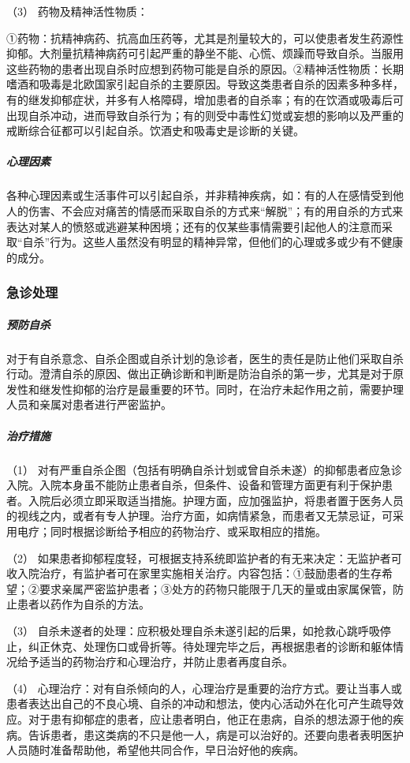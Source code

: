 \hypertarget{text00052.htmlux5cux23CHP1-18-10-2-2-3}{}
（3） 药物及精神活性物质：

①药物：抗精神病药、抗高血压药等，尤其是剂量较大的，可以使患者发生药源性抑郁。大剂量抗精神病药可引起严重的静坐不能、心慌、烦躁而导致自杀。当服用这些药物的患者出现自杀时应想到药物可能是自杀的原因。②精神活性物质：长期嗜酒和吸毒是北欧国家引起自杀的主要原因。导致这类患者自杀的因素多种多样，有的继发抑郁症状，并多有人格障碍，增加患者的自杀率；有的在饮酒或吸毒后可出现自杀冲动，进而导致自杀行为；有的则受中毒性幻觉或妄想的影响以及严重的戒断综合征都可以引起自杀。饮酒史和吸毒史是诊断的关键。

\subparagraph{心理因素}

各种心理因素或生活事件可以引起自杀，并非精神疾病，如：有的人在感情受到他人的伤害、不会应对痛苦的情感而采取自杀的方式来“解脱”；有的用自杀的方式来表达对某人的愤怒或逃避某种困境；还有的仅某些事情需要引起他人的注意而采取“自杀”行为。这些人虽然没有明显的精神异常，但他们的心理或多或少有不健康的成分。

\subsubsection{急诊处理}

\subparagraph{预防自杀}

对于有自杀意念、自杀企图或自杀计划的急诊者，医生的责任是防止他们采取自杀行动。澄清自杀的原因、做出正确诊断和判断是防治自杀的第一步，尤其是对于原发性和继发性抑郁的治疗是最重要的环节。同时，在治疗未起作用之前，需要护理人员和亲属对患者进行严密监护。

\subparagraph{治疗措施}

（1）
对有严重自杀企图（包括有明确自杀计划或曾自杀未遂）的抑郁患者应急诊入院。入院本身虽不能防止患者自杀，但条件、设备和管理方面更有利于保护患者。入院后必须立即采取适当措施。护理方面，应加强监护，将患者置于医务人员的视线之内，或者有专人护理。治疗方面，如病情紧急，而患者又无禁忌证，可采用电疗；同时根据诊断给予相应的药物治疗、或采取相应的措施。

（2）
如果患者抑郁程度轻，可根据支持系统即监护者的有无来决定：无监护者可收入院治疗，有监护者可在家里实施相关治疗。内容包括：①鼓励患者的生存希望；②要求亲属严密监护患者；③处方的药物只能限于几天的量或由家属保管，防止患者以药作为自杀的方法。

（3）
自杀未遂者的处理：应积极处理自杀未遂引起的后果，如抢救心跳呼吸停止，纠正休克、处理伤口或骨折等。待处理完毕之后，再根据患者的诊断和躯体情况给予适当的药物治疗和心理治疗，并防止患者再度自杀。

（4）
心理治疗：对有自杀倾向的人，心理治疗是重要的治疗方式。要让当事人或患者表达出自己的不良心境、自杀的冲动和想法，使内心活动外在化可产生疏导效应。对于患有抑郁症的患者，应让患者明白，他正在患病，自杀的想法源于他的疾病。告诉患者，患这类病的不只是他一人，病是可以治好的。还要向患者表明医护人员随时准备帮助他，希望他共同合作，早日治好他的疾病。

